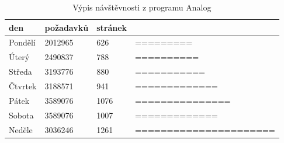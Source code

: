 \documentclass[bc,male,java,dept456]{diploma}						%
\begin{document}
\begin{table}[h]
	\centering	
\begin{tabular}{p{2cm} p{3cm} p{2cm} p{5cm}}
den&požadavků&stránek&\\
\hline
Pondělí			& 2012965			& 626	& ========= \\
Úterý			& 2490837			& 788	& ========== \\
Středa			& 3193776			& 880	& =========== \\
Čtvrtek			& 3188571			& 941	& ============= \\
Pátek			& 3589076			& 1076	& ===============\\
Sobota			& 3589076			& 1007	& ============= \\
Neděle			& 3036246			& 1261	& ======================\\
\end{tabular}

	\caption{Výpis návštěvnosti z programu Analog} 
	\label{table:analog_output}
\end{table}
\end{document}
